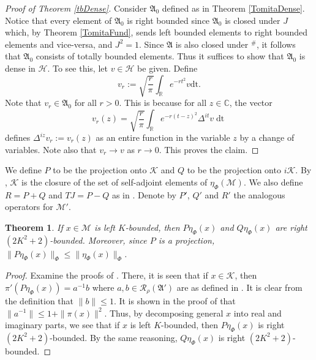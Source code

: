 \documentclass[12pt]{amsart}
\newtheorem{thm}{Theorem}[section]
\theoremstyle{definition}
\def\cal{\mathcal}
\newcommand\R{{\cal R}}
\def \bbC{\mathbb{C}}
\def \bbR{\mathbb{R}}
\begin{document}
\begin{proof}[Proof of Theorem \ref{tbDense}]
    Consider $\mathfrak{A}_0$ defined as in Theorem \ref{TomitaDense}.  Notice that every element of $\mathfrak{A}_0$ is right bounded since $\mathfrak{A}_0$ is closed under $J$ which, by Theorem \ref{TomitaFund}, sends left bounded elements to right bounded elements and vice-versa, and $J^2 = 1$.  Since $\mathfrak{A}$ is also closed under $^\#$, it follows that $\mathfrak{A}_0$ consists of totally bounded elements.  Thus it suffices to show that $\mathfrak{A}_0$ is dense in $\cal H$.  To see this, let $v \in \cal H$ be given.  Define
    \[
    v_r := \sqrt{\frac{r}{\pi}}\int_{\bbR} e^{-rt^2}v \mathrm{dt}.
    \]
    Note that $v_r \in \mathfrak{A}_0$ for all $r > 0$.  This is because for all $z \in \bbC$, the vector
    \[
        v_r(z) = \sqrt{\frac{r}{\pi}}\int_{\bbR} e^{-r(t-z)^2}\Delta^{it}v\operatorname{dt}
    \]
    defines $\Delta^{iz}v_r := v_r(z)$ as an entire function in the variable $z$ by a change of variables.  Note also that $v_r \to v$ as $r \to 0$.  This proves the claim.
\end{proof}


We define $P$ to be the projection onto $\cal K$ and $Q$ to be the projection onto $i\cal K$.  By \cite[Lemma 5.12]{RvD}, $\cal K$ is the closure of the set of self-adjoint elements of $\eta_{\Phi}(\cal M)$.  We also define $R = P + Q$ and $TJ = P - Q$ as in \cite{RvD}.  Denote by $P'$, $Q'$ and $R'$ the analogous operators for $\cal M'$.

\begin{thm}
     If $x \in \cal M$ is left $K$-bounded, then $P\eta_{\Phi}(x)$ and $Q\eta_{\Phi}(x)$ are right $(2K^2+2)$-bounded.  Moreover, since $P$ is a projection, $\|P\eta_{\Phi}(x)\|_{\Phi} \leq \|\eta_{\Phi}(x)\|_{\Phi}$.
\end{thm}

\begin{proof}
    Examine the proofs of \cite[Lemma 5.4, Lemma 5.6 and Corollary 5.7]{RvD}.  There, it is seen that if $x \in \cal K$, then $\pi'(P\eta_{\Phi}(x)) = a^{-1}b$ where $a, b \in \cal \R_{\rho}(\mathfrak{A}')$ are as defined in \cite[Lemma 5.4]{RvD}.  It is clear from the definition that $\|b\| \leq 1$.  It is shown in the proof of \cite[Lemma 5.6]{RvD} that $\|a^{-1}\| \leq 1+\|\pi(x)\|^2$.  Thus, by decomposing general $x$ into real and imaginary parts, we see that if $x$ is left $K$-bounded, then $P\eta_{\Phi}(x)$ is right $(2K^2+2)$-bounded.  By the same reasoning, $Q\eta_{\Phi}(x)$ is right $(2K^2+2)$-bounded.
\end{proof}
\end{document}
